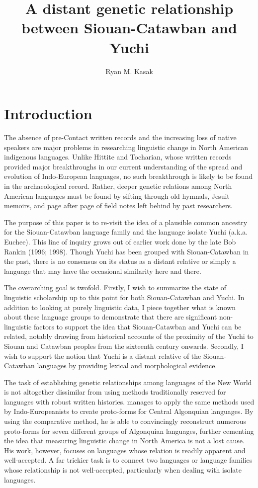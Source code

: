 \documentclass[output=paper]{LSP/langsci}
\author{Ryan M. Kasak}
\title{A distant genetic relationship between Siouan-Catawban and Yuchi}
\begin{document}
\section{Introduction}

The absence of pre-Contact written records and the increasing loss of native speakers are major problems in researching linguistic change in North American indigenous languages. Unlike Hittite and Tocharian, whose written records provided major breakthroughs in our current understanding of the spread and evolution of Indo-European languages, no such breakthrough is likely to be found in the archaeological record. Rather, deeper genetic relations among North American languages must be found by sifting through old hymnals, Jesuit memoirs, and page after page of field notes left behind by past researchers.

The purpose of this paper is to re-visit the idea of a plausible common ancestry for the Siouan-Catawban language family and the language isolate Yuchi (a.k.a. Euchee). This line of inquiry grows out of earlier work done by the late Bob Rankin (1996; 1998). Though Yuchi has been grouped with Siouan-Catawban in the past, there is no consensus on its status as a distant relative or simply a language that may have the occasional similarity here and there.

The overarching goal is twofold. Firstly, I wish to summarize the state of linguistic scholarship up to this point for both Siouan-Catawban and Yuchi. In addition to looking at purely linguistic data, I piece together what is known about these language groups to demonstrate that there are significant non-linguistic factors to support the idea that Siouan-Catawban and Yuchi can be related, notably drawing from historical accounts of the proximity of the Yuchi to Siouan and Catawban peoples from the sixteenth century onwards. Secondly, I wish to support the notion that Yuchi is a distant relative of the Siouan-Catawban languages by providing lexical and morphological evidence.

The task of establishing genetic relationships among languages of the New World is not altogether dissimilar from using methods traditionally reserved for languages with robust written histories. \citet{Bloomfield1925} manages to apply the same methods used by Indo-Europeanists to create proto-forms for Central Algonquian languages. By using the comparative method, he is able to convincingly reconstruct numerous proto-forms for seven different groups of Algonquian languages, further cementing the idea that measuring linguistic change in North America is not a lost cause. His work, however, focuses on languages whose relation is readily apparent and well-accepted. A far trickier task is to connect two languages or language families whose relationship is not well-accepted, particularly when dealing with isolate languages. 
\end{document}
